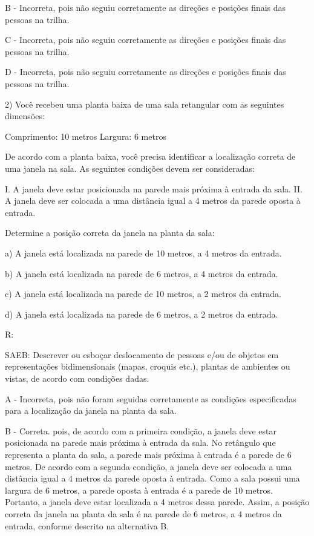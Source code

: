 B - Incorreta, pois não seguiu corretamente as direções e posições
finais das pessoas na trilha.

C - Incorreta, pois não seguiu corretamente as direções e posições
finais das pessoas na trilha.

D - Incorreta, pois não seguiu corretamente as direções e posições
finais das pessoas na trilha.

2) Você recebeu uma planta baixa de uma sala retangular com as seguintes
dimensões:

Comprimento: 10 metros Largura: 6 metros

De acordo com a planta baixa, você precisa identificar a localização
correta de uma janela na sala. As seguintes condições devem ser
consideradas:

I. A janela deve estar posicionada na parede mais próxima à entrada da
sala. II. A janela deve ser colocada a uma distância igual a 4 metros da
parede oposta à entrada.

Determine a posição correta da janela na planta da sala:

a) A janela está localizada na parede de 10 metros, a 4 metros da
entrada.

b) A janela está localizada na parede de 6 metros, a 4 metros da
entrada.

c) A janela está localizada na parede de 10 metros, a 2 metros da
entrada.

d) A janela está localizada na parede de 6 metros, a 2 metros da
entrada.

R:

SAEB: Descrever ou esboçar deslocamento de pessoas e/ou de objetos em
representações bidimensionais (mapas, croquis etc.), plantas de
ambientes ou vistas, de acordo com condições dadas.

A - Incorreta, pois não foram seguidas corretamente as condições
especificadas para a localização da janela na planta da sala.

B - Correta. pois, de acordo com a primeira condição, a janela deve
estar posicionada na parede mais próxima à entrada da sala. No retângulo
que representa a planta da sala, a parede mais próxima à entrada é a
parede de 6 metros. De acordo com a segunda condição, a janela deve ser
colocada a uma distância igual a 4 metros da parede oposta à entrada.
Como a sala possui uma largura de 6 metros, a parede oposta à entrada é
a parede de 10 metros. Portanto, a janela deve estar localizada a 4
metros dessa parede. Assim, a posição correta da janela na planta da
sala é na parede de 6 metros, a 4 metros da entrada, conforme descrito
na alternativa B.

